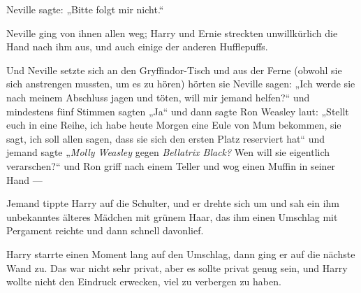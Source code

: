 Neville sagte:
„Bitte folgt mir nicht.“

Neville ging von ihnen allen weg; Harry und Ernie streckten unwillkürlich die Hand nach ihm aus, und auch einige der anderen Hufflepuffs.

Und Neville setzte sich an den Gryffindor-Tisch und aus der Ferne (obwohl sie sich anstrengen mussten, um es zu hören) hörten sie Neville sagen:
„Ich werde sie nach meinem Abschluss jagen und töten, will mir jemand helfen?“ und mindestens fünf Stimmen sagten
„Ja“ und dann sagte Ron Weasley laut:
„Stellt euch in eine Reihe, ich habe heute Morgen eine Eule von Mum bekommen, sie sagt, ich soll allen sagen, dass sie sich den ersten Platz reserviert hat“ und jemand sagte
„\emph{Molly Weasley} gegen \emph{Bellatrix Black?} Wen will sie eigentlich verarschen?“ und Ron griff nach einem Teller und wog einen Muffin in seiner Hand —

Jemand tippte Harry auf die Schulter, und er drehte sich um und sah ein ihm unbekanntes älteres Mädchen mit grünem Haar, das ihm einen Umschlag mit Pergament reichte und dann schnell davonlief.

Harry starrte einen Moment lang auf den Umschlag, dann ging er auf die nächste Wand zu. Das war nicht sehr privat, aber es sollte privat genug sein, und Harry wollte nicht den Eindruck erwecken, viel zu verbergen zu haben.


